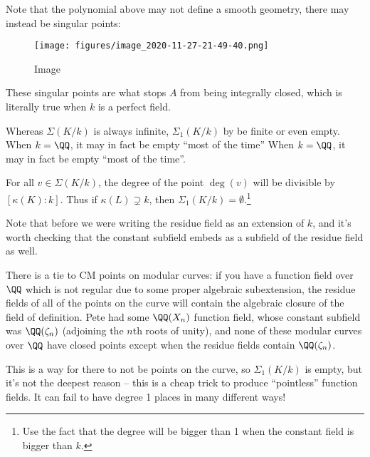 \begin{remark}

Note that the polynomial above may not define a smooth geometry, there
may instead be singular points:

\begin{figure}
\centering
\texttt{[image: figures/image\_2020-11-27-21-49-40.png]}
\caption{Image}
\end{figure}

These singular points are what stops \(A\) from being integrally closed,
which is literally true when \(k\) is a perfect field.

\end{remark}

Whereas \(\Sigma(K/k)\) is always infinite, \(\Sigma_1(K/k)\) by be
finite or even empty. When \(k = \QQ\), it may in fact be empty ``most
of the time'' When \(k = \QQ\), it may in fact be empty ``most of the
time''.

\begin{exercise}[?]

For all \(v\in \Sigma(K/k)\), the degree of the point \(\deg(v)\) will
be divisible by \([\kappa(K) : k]\). Thus if \(\kappa(L) \supsetneq k\),
then \(\Sigma_1(K/k) = \emptyset\).\footnote{Use the fact that the
  degree will be bigger than 1 when the constant field is bigger than
  \(k\).}

\end{exercise}

Note that before we were writing the residue field as an extension of
\(k\), and it's worth checking that the constant subfield embeds as a
subfield of the residue field as well.

\begin{remark}

There is a tie to CM points on modular curves: if you have a function
field over \(\QQ\) which is not regular due to some proper algebraic
subextension, the residue fields of all of the points on the curve will
contain the algebraic closure of the field of definition. Pete had some
\(\QQ(X_n)\) function field, whose constant subfield was
\(\QQ(\zeta_n)\) (adjoining the \(n\)th roots of unity), and none of
these modular curves over \(\QQ\) have closed points except when the
residue fields contain \(\QQ(\zeta_n)\).

\end{remark}

\begin{remark}

This is a way for there to not be points on the curve, so
\(\Sigma_1(K/k)\) is empty, but it's not the deepest reason -- this is a
cheap trick to produce ``pointless'' function fields. It can fail to
have degree 1 places in many different ways!

\end{remark}

